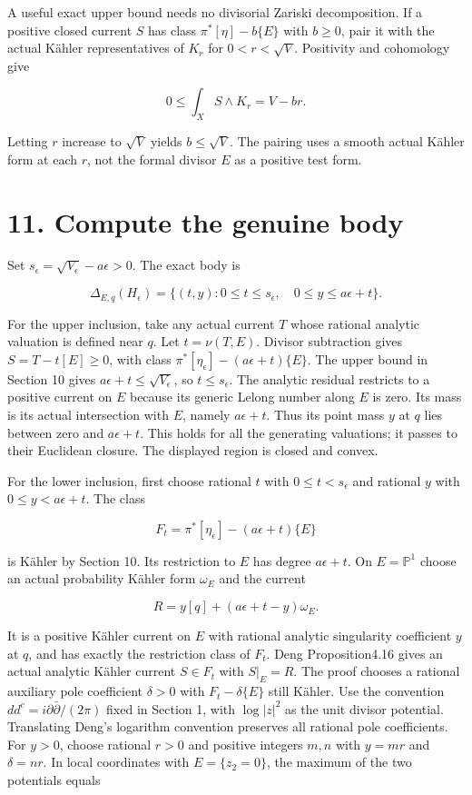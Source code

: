 \documentclass[11pt]{article}
\begin{document}
A useful exact upper bound needs no divisorial Zariski decomposition. If a positive closed current $S$ has class $\pi^*[\eta]-b\{E\}$ with $b\geq0$, pair it with the actual Kähler representatives of $K_r$ for $0<r<\sqrt V$. Positivity and cohomology give

\[0\leq\int_X S\wedge K_r=V-br.\]

Letting $r$ increase to $\sqrt V$ yields $b\leq\sqrt V$. The pairing uses a smooth actual Kähler form at each $r$, not the formal divisor $E$ as a positive test form.

\section*{11. Compute the genuine body}

Set $s_\epsilon=\sqrt{V_\epsilon}-a\epsilon>0$. The exact body is

\[\Delta_{E,q}(H_\epsilon)
=\{(t,y):0\leq t\leq s_\epsilon,\quad0\leq y\leq a\epsilon+t\}.
\tag{1}\]

For the upper inclusion, take any actual current $T$ whose rational analytic valuation is defined near $q$. Let $t=\nu(T,E)$. Divisor subtraction gives $S=T-t[E]\geq0$, with class $\pi^*[\eta_\epsilon]-(a\epsilon+t)\{E\}$. The upper bound in Section 10 gives $a\epsilon+t\leq\sqrt{V_\epsilon}$, so $t\leq s_\epsilon$. The analytic residual restricts to a positive current on $E$ because its generic Lelong number along $E$ is zero. Its mass is its actual intersection with $E$, namely $a\epsilon+t$. Thus its point mass $y$ at $q$ lies between zero and $a\epsilon+t$. This holds for all the generating valuations; it passes to their Euclidean closure. The displayed region is closed and convex.

For the lower inclusion, first choose rational $t$ with $0\leq t<s_\epsilon$ and rational $y$ with $0\leq y<a\epsilon+t$. The class

\[F_t=\pi^*[\eta_\epsilon]-(a\epsilon+t)\{E\}\]

is Kähler by Section 10. Its restriction to $E$ has degree $a\epsilon+t$. On $E=\mathbb P^1$ choose an actual probability Kähler form $\omega_E$ and the current

\[R=y[q]+(a\epsilon+t-y)\omega_E.\]

It is a positive Kähler current on $E$ with rational analytic singularity coefficient $y$ at $q$, and has exactly the restriction class of $F_t$. Deng Proposition4.16 gives an actual analytic Kähler current $S\in F_t$ with $S|_E=R$. The proof chooses a rational auxiliary pole coefficient $\delta>0$ with $F_t-\delta\{E\}$ still Kähler. Use the convention $dd^c=i\partial\bar\partial/(2\pi)$ fixed in Section 1, with $\log|z|^2$ as the unit divisor potential. Translating Deng's logarithm convention preserves all rational pole coefficients. For $y>0$, choose rational $r>0$ and positive integers $m,n$ with $y=mr$ and $\delta=nr$. In local coordinates with $E=\{z_2=0\}$, the maximum of the two potentials equals
\end{document}
